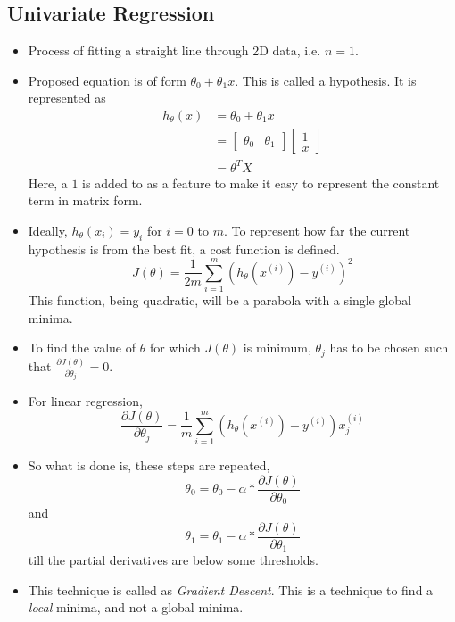 \documentclass{article}
\begin{document}
\subsection{Univariate Regression}
\begin{itemize}
	\item Process of fitting a straight line through 2D data, i.e. $n=1$.
	\item Proposed equation is of form $\theta_0 + \theta_1 x$. This is called a hypothesis. It is represented as
	\begin{align*}
		h_\theta(x)&=\theta_0 + \theta_1 x\\
		&= \begin{bmatrix}
			\theta_0 & \theta_1
		\end{bmatrix}
		\begin{bmatrix}
			1 \\x
		\end{bmatrix}\\
		&= \theta^T X
	\end{align*}
	Here, a $1$ is added to as a feature to make it easy to represent the constant term in matrix form.
	\item Ideally, $h_\theta(x_i)=y_i$ for $i=0$ to $m$. To represent how far the current hypothesis is from the best fit, a cost function is defined.
	$$J(\theta)= \frac{1}{2m} \sum_{i=1}^{m} (h_\theta(x^{(i)})-y^{(i)})^2$$
	This function, being quadratic, will be a parabola with a single global minima.
	\item To find the value of $\theta$ for which $J(\theta)$ is minimum, $\theta_j$ has to be chosen such that $\frac{\partial J(\theta)}{\partial \theta_j}=0$.
	\item For linear regression, $$\frac{\partial J(\theta)}{\partial \theta_j}=\frac{1}{m} \sum_{i=1}^{m} (h_\theta(x^{(i)})-y^{(i)})x_j^{(i)}$$
	\item So what is done is, these steps are repeated, $$\theta_0 = \theta_0 - \alpha * \frac{\partial J(\theta)}{\partial \theta_0}$$ and
	$$\theta_1 = \theta_1 - \alpha * \frac{\partial J(\theta)}{\partial \theta_1}$$ till the partial derivatives are below some thresholds.

	\item This technique is called as \emph{Gradient Descent}. This is a technique to find a \emph{local} minima, and not a global minima.
\end{itemize}
\end{document}
